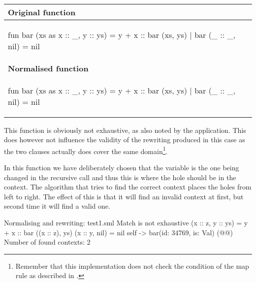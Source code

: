 \begin{example}\
  \label{ex:eval-map-rewrite-bar}\\

  \begin{center}
    \begin{tabular}{|l|}
      \hline
      \textbf{Original function}
      \\\hline
      \begin{sml}
fun bar (xs as x :: _, y :: ys) = y + x :: bar (xs, ys)
  | bar (_ :: _, nil) = nil
      \end{sml}
      \\\hline
      \textbf{Normalised function}
      \\\hline
      \begin{sml}
fun bar (xs as x :: _, y :: ys) = y + x :: bar (xs, ys)
  | bar (_ :: _, nil) = nil        
      \end{sml}
      \\\hline
    \end{tabular}
  \end{center}

  \noindent
  This function is obviously not exhaustive, as also noted by the
  \ttt{RewriteMap} application. This does however not influence the validity of
  the rewriting produced in this case as the two clauses actually does cover the
  same domain\footnote{Remember that this implementation does not check the
    \ttt{where} condition of the map rule as described in
    .}.

  In this function we have deliberately chosen that the  variable is the
  one being changed in the recursive call and thus this is where the hole should
  be in the context. The algorithm that tries to find the correct context places
  the holes from left to right. The effect of this is that it will find an
  invalid context at first, but second time it will find a valid one.

  \begin{narrow}{-3em}{0em}
    \setlength{\linewidth}{1.2\linewidth}
    \footnotesize
    
    \begin{multicols}{2}           
      \begin{sml}
Normalising and rewriting: test1.sml
Match is not exhaustive
  (x :: z, y :: ys) = y + x :: bar ((x :: z), ys)
  (x :: y, nil) = nil
self -> bar(id: 34769, is: Val)
(@@)
Number of found contexts: 2


\end{sml}
\end{multicols}
\end{narrow}
\end{example}
